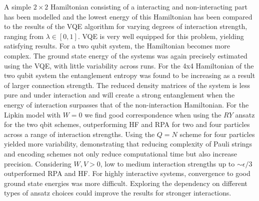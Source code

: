 A simple $2\times 2$ Hamiltonian consisting of a interacting and non-interacting part has been modelled and the lowest energy of this Hamiltonian has been compared to the results of the VQE algorithm for varying degrees of interaction strength, ranging from $\lambda \in [0,1]$. VQE is very well equipped for this problem, yielding satisfying results. For a two qubit system, the Hamiltonian becomes more complex. The ground state energy of the systems was again precisely estimated using the VQE, with little variability across runs.
\newline For the 4x4 Hamiltonian of the two qubit system the entanglement entropy was found to be increasing as a result of larger connection strength. The reduced density matrices of the system is less pure and under interaction and will create a strong entanglement when the energy of interaction surpasses that of the non-interaction Hamiltonian. 
\newline
For the Lipkin model with $W=0$ we find good correspondence when using the $RY$ ansatz for the two qbit schemes, outperforming HF and RPA for two and four particles across a range of interaction strengths. Using the $Q = N$ scheme for four particles yielded more variability, demonstrating that reducing complexity of Pauli strings and encoding schemes not only reduce computational time but also increase precision. Considering $W, V > 0$, low to medium interaction strengths up to $\sim \epsilon/3$ outperformed RPA and HF. For highly interactive systems, convergence to good ground state energies was more difficult. Exploring the dependency on different types of ansatz choices could improve the results for stronger interactions.
